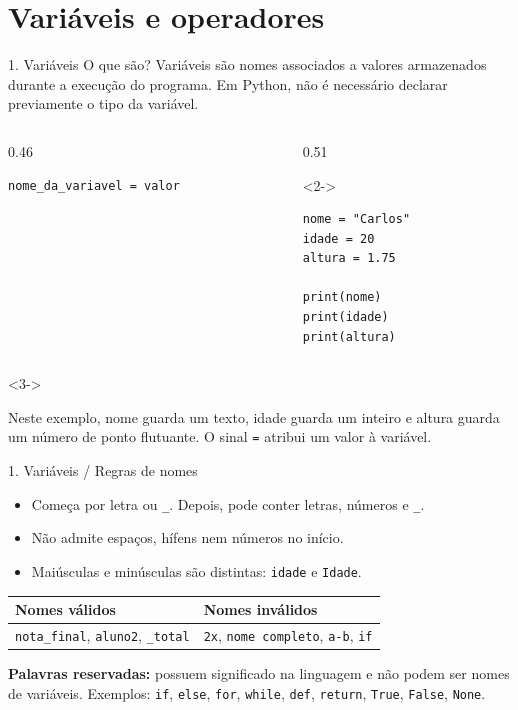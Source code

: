 \section{Variáveis e operadores}

\begin{frame}[fragile,t]{1. Variáveis}
O que são? Variáveis são nomes associados a valores armazenados durante a execução do programa. Em Python, não é necessário declarar previamente o tipo da variável.\par
\begin{columns}[T,onlytextwidth]
\begin{column}{0.46\textwidth}
\begin{lstlisting}
nome_da_variavel = valor
\end{lstlisting}
\end{column}
\begin{column}{0.51\textwidth}
\begin{visibleenv}<2->
\begin{lstlisting}
nome = "Carlos"
idade = 20
altura = 1.75

print(nome)
print(idade)
print(altura)
\end{lstlisting}
\end{visibleenv}
\end{column}
\end{columns}
\begin{visibleenv}<3->
\begin{EMASCnote}
Neste exemplo, nome guarda um texto, idade guarda um inteiro e altura guarda um número de ponto flutuante. O sinal \texttt{=} atribui um valor à variável.
\end{EMASCnote}
\end{visibleenv}
\end{frame}

\begin{frame}[t]{1. Variáveis / Regras de nomes}
\begin{itemize}
  \item Começa por letra ou \texttt{\_}. Depois, pode conter letras, números e \texttt{\_}.
  \item Não admite espaços, hífens nem números no início.
  \item Maiúsculas e minúsculas são distintas: \texttt{idade} e \texttt{Idade}.
\end{itemize}
\medskip
\begin{tabularx}{\linewidth}{@{}XX@{}}
\toprule
\textbf{Nomes válidos} & \textbf{Nomes inválidos} \\
\midrule
\texttt{nota\_final}, \texttt{aluno2}, \texttt{\_total} &
\texttt{2x}, \texttt{nome completo}, \texttt{a-b}, \texttt{if} \\
\bottomrule
\end{tabularx}
\begin{EMASCnote}
\textbf{Palavras reservadas:} possuem significado na linguagem e não podem ser nomes de variáveis. Exemplos: \texttt{if}, \texttt{else}, \texttt{for}, \texttt{while}, \texttt{def}, \texttt{return}, \texttt{True}, \texttt{False}, \texttt{None}.
\end{EMASCnote}
\end{frame}


